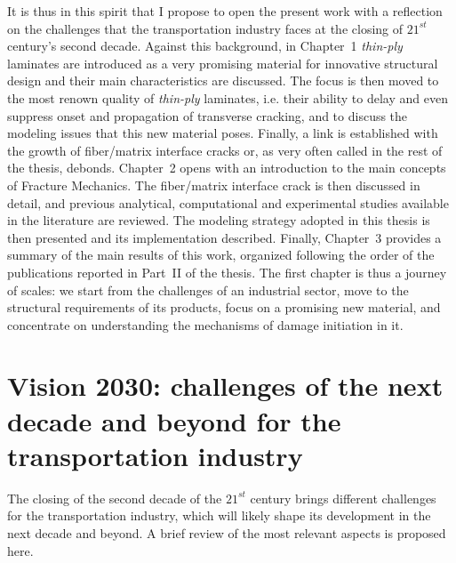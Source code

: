 It is thus in this spirit that I propose to open the present work with a reflection on the challenges that the transportation industry faces at the closing of $21^{st}$ century's second decade. Against this background, in Chapter~1 \emph{thin-ply} laminates are introduced as a very promising material for innovative structural design and their main characteristics are discussed. The focus is then moved to the most renown quality of \emph{thin-ply} laminates, i.e. their ability to delay and even suppress onset and propagation of transverse cracking, and to discuss the modeling issues that this new material poses. Finally, a link is established with the growth of fiber/matrix interface cracks or, as very often called in the rest of the thesis, debonds. Chapter~2 opens with an introduction to the main concepts of Fracture Mechanics. The fiber/matrix interface crack is then discussed in detail, and previous analytical, computational and experimental studies available in the literature are reviewed. The modeling strategy adopted in this thesis is then presented and its implementation described. Finally, Chapter~3 provides a summary of the main results of this work, organized following the order of the publications reported in Part~II of the thesis. The first chapter is thus a journey of scales: we start from the challenges of an industrial sector, move to the structural requirements of its products, focus on a promising new material, and concentrate on understanding the mechanisms of damage initiation in it.

\section{Vision 2030: challenges of the next decade and beyond for the transportation industry}

The closing of the second decade of the $21^{st}$ century brings different challenges for the transportation industry, which will likely shape its development in the next decade and beyond. A brief review of the most relevant aspects is proposed here.

